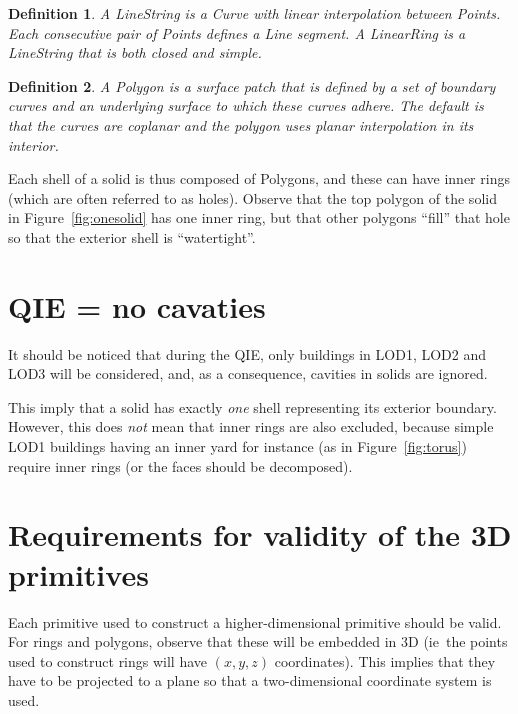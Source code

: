 \documentclass[a4paper,parskip=half,11pt]{scrartcl}
\newcommand{\ie}{ie}
\newtheorem{definition}{Definition}
\begin{document}
\begin{definition}
A LineString is a Curve with linear interpolation between Points. Each consecutive pair of Points defines a Line segment.
A LinearRing is a LineString that is both closed and simple.
\end{definition}
\begin{definition}
A Polygon is a surface patch that is defined by a set of boundary curves and an underlying surface to which these curves adhere. 
The default is that the curves are coplanar and the polygon uses planar interpolation in its interior.
\end{definition}

Each shell of a solid is thus composed of Polygons, and these can have inner rings (which are often referred to as holes).
Observe that the top polygon of the solid in Figure~\ref{fig:onesolid} has one inner ring, but that other polygons ``fill'' that hole so that the exterior shell is ``watertight''.


%
\section{QIE = no cavaties}

It should be noticed that during the QIE, only buildings in LOD1, LOD2 and LOD3 will be considered, and, as a consequence, cavities in solids are ignored.

This imply that a solid has exactly \emph{one} shell representing its exterior boundary.
However, this does \emph{not} mean that inner rings are also excluded, because simple LOD1 buildings having an inner yard for instance (as in Figure~\ref{fig:torus}) require inner rings (or the faces should be decomposed).


%
\section{Requirements for validity of the 3D primitives}

Each primitive used to construct a higher-dimensional primitive should be valid.
For rings and polygons, observe that these will be embedded in 3D (\ie\ the points used to construct rings will have $(x,y,z)$ coordinates).
This implies that they have to be projected to a plane so that a two-dimensional coordinate system is used.
\end{document}
